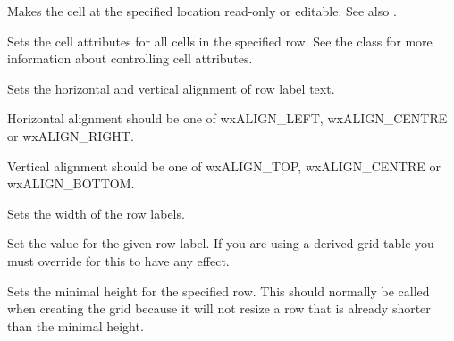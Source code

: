 Makes the cell at the specified location read-only or editable.
See also .

\label{wxgridsetrowattr}


Sets the cell attributes for all cells in the specified row.
See the  class for more information
about controlling cell attributes.

\label{wxgridsetrowlabelalignment}


Sets the horizontal and vertical alignment of row label text.

Horizontal alignment should be one of wxALIGN\_LEFT, wxALIGN\_CENTRE or wxALIGN\_RIGHT.

Vertical alignment should be one of wxALIGN\_TOP, wxALIGN\_CENTRE or wxALIGN\_BOTTOM.

\label{wxgridsetrowlabelsize}


Sets the width of the row labels.

\label{wxgridsetrowlabelvalue}


Set the value for the given row label. If you are using a derived grid table you must 
override  
for this to have any effect.

\label{wxgridsetrowminimalheight}


Sets the minimal height for the specified row. This should normally be called when creating the grid
because it will not resize a row that is already shorter than the minimal height.

\label{wxgridsetrowsize}


